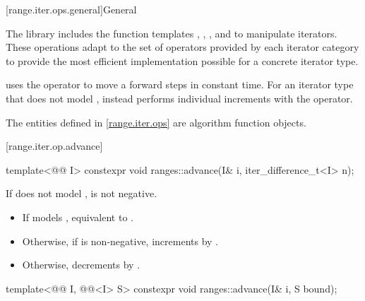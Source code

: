 [range.iter.ops.general]{General}

\pnum
The library includes the function templates
, ,
, and 
to manipulate iterators. These operations adapt to the set of operators
provided by each iterator category to provide the most efficient implementation
possible for a concrete iterator type.
\begin{example}
 uses the \tcode{+} operator to move a
 forward  steps in constant time.
For an iterator type that does not model ,
 instead performs  individual increments with
the \tcode{++} operator.
\end{example}

\pnum
The entities defined in \ref{range.iter.ops} are
algorithm function objects.

[range.iter.op.advance]{}

%
\begin{itemdecl}
template<@@ I>
  constexpr void ranges::advance(I& i, iter_difference_t<I> n);
\end{itemdecl}

\begin{itemdescr}
\pnum
\expects
If  does not model ,
 is not negative.

\pnum
\effects
\begin{itemize}
\item If  models ,
  equivalent to .
\item Otherwise, if  is non-negative, increments
   by .
\item Otherwise, decrements  by .
\end{itemize}
\end{itemdescr}

%
\begin{itemdecl}
template<@@ I, @@<I> S>
  constexpr void ranges::advance(I& i, S bound);
\end{itemdecl}

